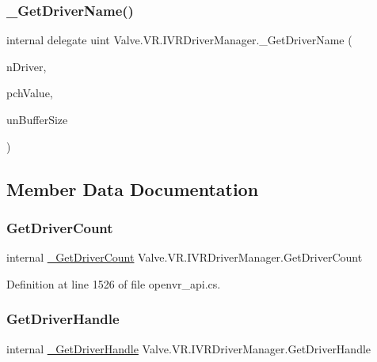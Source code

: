 \subsubsection{\texorpdfstring{\_GetDriverName()}{\_GetDriverName()}}
{\footnotesize\ttfamily internal delegate uint Valve.\+V\+R.\+I\+V\+R\+Driver\+Manager.\+\_\+\+Get\+Driver\+Name (\begin{DoxyParamCaption}\item[{uint}]{n\+Driver,  }\item[{System.\+Text.\+String\+Builder}]{pch\+Value,  }\item[{uint}]{un\+Buffer\+Size }\end{DoxyParamCaption})}



\subsection{Member Data Documentation}
\mbox{\label{struct_valve_1_1_v_r_1_1_i_v_r_driver_manager_aefb6e076f538c8f168025cf250f563cb}} 
\subsubsection{\texorpdfstring{GetDriverCount}{GetDriverCount}}
{\footnotesize\ttfamily internal \mbox{\hyperlink{struct_valve_1_1_v_r_1_1_i_v_r_driver_manager_a3f4779d5c5c112ee3d6aef2460b812e7}{\+\_\+\+Get\+Driver\+Count}} Valve.\+V\+R.\+I\+V\+R\+Driver\+Manager.\+Get\+Driver\+Count}



Definition at line 1526 of file openvr\+\_\+api.\+cs.

\mbox{\label{struct_valve_1_1_v_r_1_1_i_v_r_driver_manager_a5c0cff9a7d7f49a0b64ebb6afaa30e9a}} 
\subsubsection{\texorpdfstring{GetDriverHandle}{GetDriverHandle}}
{\footnotesize\ttfamily internal \mbox{\hyperlink{struct_valve_1_1_v_r_1_1_i_v_r_driver_manager_accb66a40c924f73c45ee373874ac69e7}{\+\_\+\+Get\+Driver\+Handle}} Valve.\+V\+R.\+I\+V\+R\+Driver\+Manager.\+Get\+Driver\+Handle}



